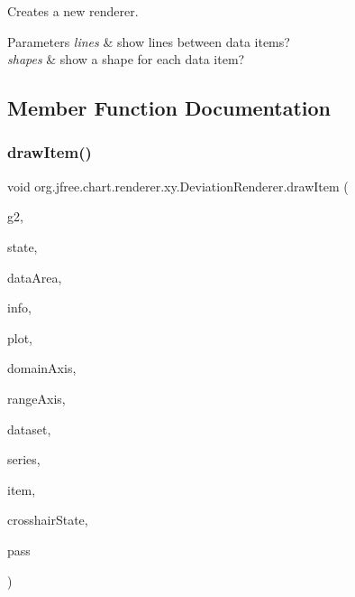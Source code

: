 Creates a new renderer.


\begin{DoxyParams}{Parameters}
{\em lines} & show lines between data items? \\
\hline
{\em shapes} & show a shape for each data item? \\
\hline
\end{DoxyParams}


\subsection{Member Function Documentation}
\mbox{\label{classorg_1_1jfree_1_1chart_1_1renderer_1_1xy_1_1_deviation_renderer_aaf296dfa0e63a160132fd5e4d12f6422}} 
\subsubsection{\texorpdfstring{draw\+Item()}{drawItem()}}
{\footnotesize\ttfamily void org.\+jfree.\+chart.\+renderer.\+xy.\+Deviation\+Renderer.\+draw\+Item (\begin{DoxyParamCaption}\item[{Graphics2D}]{g2,  }\item[{\mbox{\hyperlink{classorg_1_1jfree_1_1chart_1_1renderer_1_1xy_1_1_x_y_item_renderer_state}{X\+Y\+Item\+Renderer\+State}}}]{state,  }\item[{Rectangle2D}]{data\+Area,  }\item[{\mbox{\hyperlink{classorg_1_1jfree_1_1chart_1_1plot_1_1_plot_rendering_info}{Plot\+Rendering\+Info}}}]{info,  }\item[{\mbox{\hyperlink{classorg_1_1jfree_1_1chart_1_1plot_1_1_x_y_plot}{X\+Y\+Plot}}}]{plot,  }\item[{\mbox{\hyperlink{classorg_1_1jfree_1_1chart_1_1axis_1_1_value_axis}{Value\+Axis}}}]{domain\+Axis,  }\item[{\mbox{\hyperlink{classorg_1_1jfree_1_1chart_1_1axis_1_1_value_axis}{Value\+Axis}}}]{range\+Axis,  }\item[{\mbox{\hyperlink{interfaceorg_1_1jfree_1_1data_1_1xy_1_1_x_y_dataset}{X\+Y\+Dataset}}}]{dataset,  }\item[{int}]{series,  }\item[{int}]{item,  }\item[{\mbox{\hyperlink{classorg_1_1jfree_1_1chart_1_1plot_1_1_crosshair_state}{Crosshair\+State}}}]{crosshair\+State,  }\item[{int}]{pass }\end{DoxyParamCaption})}

